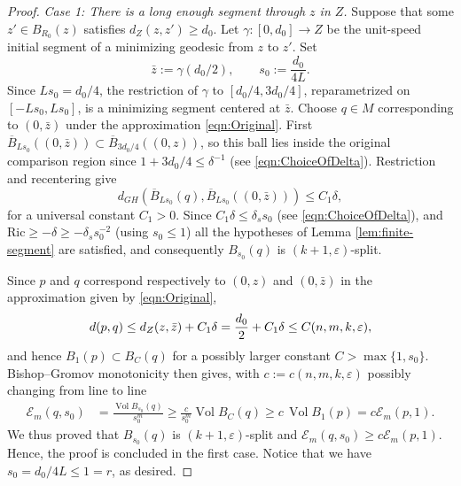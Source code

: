 \documentclass[10pt,a4paper]{amsart}
\newcommand{\Ex}{\mathcal E}
\DeclareMathOperator{\Vol}{Vol}
\begin{document}
\begin{proof}
\smallskip
\noindent
\emph{Case 1: There is a long enough segment through $z$ in $Z$.}
Suppose that some $z'\in B_{R_0}(z)$ satisfies
$d_Z(z,z')\geq d_0$. Let $\gamma:[0,d_0]\to Z$ be the unit-speed initial segment of a minimizing geodesic from $z$ to $z'$. Set
\[
 \bar z:=\gamma(d_0/2),
 \qquad
 s_0:=\frac{d_0}{4L}.
\]
Since $Ls_0=d_0/4$, the restriction of $\gamma$ to
$[d_0/4,3d_0/4]$, reparametrized on $[-Ls_0,Ls_0]$, is a minimizing
segment centered at $\bar z$. Choose $q\in M$ corresponding to $(0,\bar z)$ under the approximation \eqref{eqn:Original}. First
$ \overline B_{Ls_0}((0,\bar z))
 \subset \overline B_{3d_0/4}((0,z))$,
so this ball lies inside the original comparison region since $1+3d_0/4\le \delta^{-1}$ (see \eqref{eqn:ChoiceOfDelta}). Restriction
and recentering give
\[
 d_{GH}\!\left(
 \overline B_{Ls_0}(q),
 \overline B_{Ls_0}((0,\bar z))
 \right)
 \leq C_1\delta,
\]
for a universal constant $C_1>0$.
Since
 $C_{1}\delta\leq\delta_s s_0$ (see \eqref{eqn:ChoiceOfDelta}), and $\mathrm{Ric}\geq -\delta\geq -\delta_ss_0^{-2}$ (using $s_0\leq 1$) all the hypotheses of Lemma \ref{lem:finite-segment} are
satisfied, and consequently $B_{s_0}(q)$ is
$(k+1,\varepsilon)$-split.

Since $p$ and $q$ correspond respectively to $(0,z)$ and
$(0,\bar z)$ in the approximation given by \eqref{eqn:Original},
\[
 d(p,q)\leq d_Z(z,\bar z)+C_{\rm 1}\delta
          =\frac{d_0}{2}+C_{\rm 1}\delta
          \leq C(n,m,k,\varepsilon),
\] 
and hence $B_1(p)\subset B_{C}(q)$ for a possibly larger constant $C>\max\{1,s_0\}$.
Bishop--Gromov monotonicity then gives, with $c:=c(n,m,k,\varepsilon)$ possibly changing from line to line
\[
 \begin{split}
 \Ex_m(q,s_0)
 &=\frac{\Vol B_{s_0}(q)}{s_0^m}
 \geq \frac{c}{s_0^m}\Vol B_C(q)
 \geq c\,\Vol B_1(p)
 =c\Ex_m(p,1).
 \end{split}
\]
We thus proved that $B_{s_0}(q)$ is $(k+1,\varepsilon)$-split and $\Ex_m(q,s_0)\geq c\Ex_m(p,1)$. Hence, the proof is concluded in the first case. Notice that we have $s_0=d_0/4L\leq 1=r$, as desired.


\end{proof}
\end{document}
